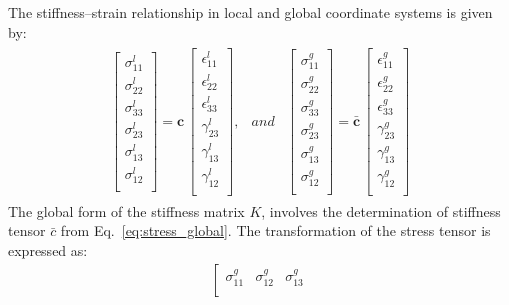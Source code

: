 \documentclass[a4paper,12pt]{article}
\begin{document}
{The stiffness--strain relationship in local and global coordinate systems is given by:
\begin{eqnarray}
\begin{array}{ccc}
\left [
\begin{array}{c}
\sigma^l_{11}\\
\sigma^l_{22}\\ 
\sigma^l_{33}\\ 
\sigma^l_{23}\\
\sigma^l_{13}\\
\sigma^l_{12}\\
\end{array}
\right ]=
\textbf{c}\,\left [
\begin{array}{c}
\epsilon^l_{11}\\
\epsilon^l_{22}\\ 
\epsilon^l_{33}\\
\gamma^l_{23}\\
\gamma^l_{13}\\
\gamma^l_{12}\\
\end{array}
\right ], & and &
\left [
\begin{array}{c}
\sigma^g_{11}\\
\sigma^g_{22}\\ 
\sigma^g_{33}\\ 
\sigma^g_{23}\\
\sigma^g_{13}\\
\sigma^g_{12}\\
\end{array}
\right ]=
\bar{\textbf{c}}\,\left [
\begin{array}{c}
\epsilon^g_{11}\\
\epsilon^g_{22}\\ 
\epsilon^g_{33}\\
\gamma^g_{23}\\
\gamma^g_{13}\\
\gamma^g_{12}\\
\end{array}
\right ]
\end{array}
\label{eq:stress_global}
\end{eqnarray}
The global form of the stiffness matrix \(K\), involves the determination of stiffness tensor \(\bar{c}\) from Eq.~\ref{eq:stress_global}.
The transformation of the stress tensor is expressed as:
\begin{eqnarray}
\left [ 
\begin{array}{ccc}
\sigma^g_{11} & \sigma^g_{12} & \sigma^g_{13}\\

\end{array}
\end{eqnarray}}
\end{document}
